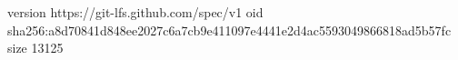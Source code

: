 version https://git-lfs.github.com/spec/v1
oid sha256:a8d70841d848ee2027c6a7cb9e411097e4441e2d4ac5593049866818ad5b57fc
size 13125
